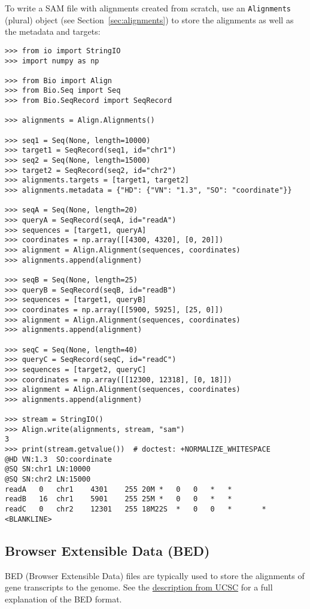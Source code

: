 To write a SAM file with alignments created from scratch, use an \verb|Alignments| (plural) object (see Section~\ref{sec:alignments}) to store the alignments as well as the metadata and targets:
\begin{verbatim}
>>> from io import StringIO
>>> import numpy as np

>>> from Bio import Align
>>> from Bio.Seq import Seq
>>> from Bio.SeqRecord import SeqRecord

>>> alignments = Align.Alignments()

>>> seq1 = Seq(None, length=10000)
>>> target1 = SeqRecord(seq1, id="chr1")
>>> seq2 = Seq(None, length=15000)
>>> target2 = SeqRecord(seq2, id="chr2")
>>> alignments.targets = [target1, target2]
>>> alignments.metadata = {"HD": {"VN": "1.3", "SO": "coordinate"}}

>>> seqA = Seq(None, length=20)
>>> queryA = SeqRecord(seqA, id="readA")
>>> sequences = [target1, queryA]
>>> coordinates = np.array([[4300, 4320], [0, 20]])
>>> alignment = Align.Alignment(sequences, coordinates)
>>> alignments.append(alignment)

>>> seqB = Seq(None, length=25)
>>> queryB = SeqRecord(seqB, id="readB")
>>> sequences = [target1, queryB]
>>> coordinates = np.array([[5900, 5925], [25, 0]])
>>> alignment = Align.Alignment(sequences, coordinates)
>>> alignments.append(alignment)

>>> seqC = Seq(None, length=40)
>>> queryC = SeqRecord(seqC, id="readC")
>>> sequences = [target2, queryC]
>>> coordinates = np.array([[12300, 12318], [0, 18]])
>>> alignment = Align.Alignment(sequences, coordinates)
>>> alignments.append(alignment)

>>> stream = StringIO()
>>> Align.write(alignments, stream, "sam")
3
>>> print(stream.getvalue())  # doctest: +NORMALIZE_WHITESPACE
@HD	VN:1.3	SO:coordinate
@SQ	SN:chr1	LN:10000
@SQ	SN:chr2	LN:15000
readA	0	chr1	4301	255	20M	*	0	0	*	*
readB	16	chr1	5901	255	25M	*	0	0	*	*
readC	0	chr2	12301	255	18M22S	*	0	0	*       *
<BLANKLINE>
\end{verbatim}

\subsection{Browser Extensible Data (BED)}
\label{subsec:align_bed}

BED (Browser Extensible Data) files are typically used to store the alignments of gene transcripts to the genome. See the \href{http://genome.cse.ucsc.edu/FAQ/FAQformat.html#format1}{description from UCSC} for a full explanation of the BED format.

